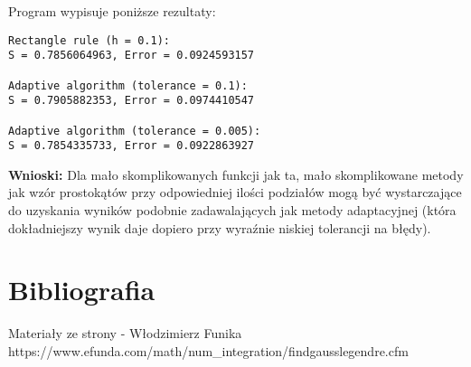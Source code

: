 \documentclass{article}
\begin{document}
\noindent
Program wypisuje poniższe rezultaty:

\begin{verbatim}
Rectangle rule (h = 0.1):
S = 0.7856064963, Error = 0.0924593157

Adaptive algorithm (tolerance = 0.1):
S = 0.7905882353, Error = 0.0974410547

Adaptive algorithm (tolerance = 0.005):
S = 0.7854335733, Error = 0.0922863927
\end{verbatim}

\noindent
\textbf{Wnioski:} Dla mało skomplikowanych funkcji jak ta, mało skomplikowane metody jak wzór prostokątów przy odpowiedniej ilości podziałów mogą być wystarczające do uzyskania wyników podobnie zadawalających jak metody adaptacyjnej (która dokładniejszy wynik daje dopiero przy wyraźnie niskiej tolerancji na błędy). 

\subsection{}

\section{Bibliografia}
Materiały ze strony - Włodzimierz Funika\\
https://www.efunda.com/math/num\_integration/findgausslegendre.cfm
\end{document}
